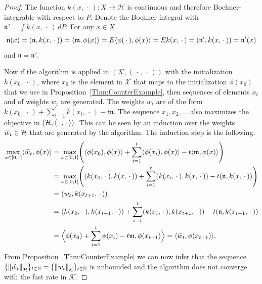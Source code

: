 \documentclass[AHL,Unicode,longabstracts,published]{cedram}
\theoremstyle{remark}
\newcommand{\bbN}{\mathbb{N}}
\newcommand{\E}{E}
\newcommand{\X}{\mathcal{X}}
\newcommand{\cH}{\mathcal{H}}
\newcommand{\clK}{\mathcal{K}}
\newcommand{\fkn}{\mathfrak{n}}
\newcommand{\mean}{\mathfrak{m}}
\providecommand{\norm}[1]{\left\lVert#1\right\rVert}
\providecommand{\inner}[2]{\left\langle #1,#2\right\rangle}
\let\oldtilde\tilde
\renewcommand*{\tilde}[1]{\mathchoice{\widetilde{#1}}{\widetilde{#1}}{\oldtilde{#1}}{\oldtilde{#1}}}
\let\originalleft\left
\let\originalright\right
\renewcommand{\left}{\mathopen{}\mathclose\bgroup\originalleft}
\renewcommand{\right}{\aftergroup\egroup\originalright}
\newcounter{setofstep}
\newcounter{step}[setofstep]
\begin{document}
\begin{proof}
The function $k(x,\,\cdot\,): X \rightarrow \cH$ is continuous and therefore Bochner-integrable with respect to $P$. Denote the Bochner integral with $\fkn' = \int k(x,\,\cdot\,) \, dP$. For any $x \in X$
\[
\fkn(x) = (\fkn, k(x,\,\cdot\,)) = \inner{\mean}{\phi(x)} = \E \inner{\phi(\,\cdot\,)}{\phi(x)} =
\E k(x,\,\cdot\,) = (\fkn',k(x,\,\cdot\,)) = \fkn'(x)
\]
and $\fkn = \fkn'$.

Now if the algorithm is applied in $(\clK,(\,\cdot\,,\,\cdot\,))$ with the initialization $k(x_0,\,\cdot\,)$, where $x_0$ is the element in $\X$ that maps to the initialization $\phi(x_0)$ that we use in Proposition~\ref{Thm:CounterExample}, then sequences of elements $x_t$ and of weights $w_t$ are generated. The weights $w_t$ are of the form $k(x_0,\,\cdot\,) + \sum_{i=1}^t k(x_i,\,\cdot\,) - t \fkn$. The sequence $x_1,x_2, \dots$ also maximizes the objective in $(\cH,\inner{\,\cdot\,}{\,\cdot\,})$. This can be seen by an induction over the weights $\tilde w_t \in \cH$ that are generated by the algorithm. The induction step is the following.
\begin{align*}
\max_{x \in [0,1]} \inner{\tilde w_t}{\phi(x)} %
&= \max_{x \in [0,1]} \left(\inner{\phi(x_0)}{\phi(x)} + \sum_{i=1}^t \inner{\phi(x_i)}{\phi(x)} - t \inner{\mean}{\phi(x)}\right) \\
&= \max_{x \in [0,1]} \left((k(x_0,\,\cdot\,),k(x,\,\cdot\,)) + \sum_{i=1}^t (k(x_i,\,\cdot\,),k(x,\,\cdot\,)) - t(\fkn,k(x,\,\cdot\,))\right)\\
&= (w_t,k(x_{t+1},\,\cdot\,)) \\
&= (k(x_0,\,\cdot\,),k(x_{t+1},\,\cdot\,)) + \sum_{i=1}^t (k(x_i,\,\cdot\,),k(x_{t+1},\,\cdot\,)) - t(\fkn,k(x_{t+1},\,\cdot\,)) \\
&= \Bigl\langle \phi(x_0) + \sum_{i=1}^t \phi(x_i) -t\mean,\phi(x_{t+1})\Bigr\rangle = \inner{\tilde w_t}{\phi(x_{t+1})}.
\end{align*}
From Proposition~\ref{Thm:CounterExample} we can now infer that the sequence $\{\norm{\tilde w_t}_\cH\}_{t \in \bbN} = \{\norm{w_t}_\clK\}_{t \in \bbN}$ is unbounded and the algorithm does not converge with the fast rate in $\clK$.
\end{proof}

\clearpage
\newpage
\footnotesize
{
\makeatletter
\renewcommand*\descriptionlabel[1]{
\normalfont\bfseries #1 }
\makeatother
\printglossary[style={centerdesc},
title={List of Notation}, toctitle={List of Notation}]
 }


\newpage



\end{document}
